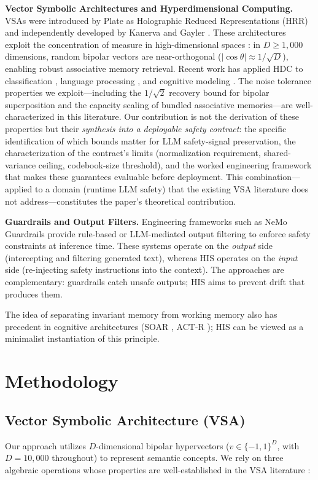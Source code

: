 \documentclass[a4paper,11pt]{article}
\begin{document}
\textbf{Vector Symbolic Architectures and Hyperdimensional Computing.}
VSAs were introduced by Plate \cite{plate1995} as Holographic Reduced Representations (HRR) and independently developed by Kanerva \cite{kanerva2009} and Gayler \cite{gayler2003}. These architectures exploit the concentration of measure in high-dimensional spaces \cite{vershynin2018}: in $D \geq 1{,}000$ dimensions, random bipolar vectors are near-orthogonal ($|\cos\theta| \approx 1/\sqrt{D}$), enabling robust associative memory retrieval. Recent work has applied HDC to classification \cite{thomas2021}, language processing \cite{schlegel2022}, and cognitive modeling \cite{eliasmith2012}. The noise tolerance properties we exploit---including the $1/\sqrt{2}$ recovery bound for bipolar superposition and the capacity scaling of bundled associative memories---are well-characterized in this literature. Our contribution is not the derivation of these properties but their \textit{synthesis into a deployable safety contract}: the specific identification of which bounds matter for LLM safety-signal preservation, the characterization of the contract's limits (normalization requirement, shared-variance ceiling, codebook-size threshold), and the worked engineering framework that makes these guarantees evaluable before deployment. This combination---applied to a domain (runtime LLM safety) that the existing VSA literature does not address---constitutes the paper's theoretical contribution.

\textbf{Guardrails and Output Filters.}
Engineering frameworks such as NeMo Guardrails \cite{rebedea2023} provide rule-based or LLM-mediated output filtering to enforce safety constraints at inference time. These systems operate on the \textit{output} side (intercepting and filtering generated text), whereas HIS operates on the \textit{input} side (re-injecting safety instructions into the context). The approaches are complementary: guardrails catch unsafe outputs; HIS aims to prevent drift that produces them.

The idea of separating invariant memory from working memory also has precedent in cognitive architectures (SOAR \cite{laird2012}, ACT-R \cite{anderson2004}); HIS can be viewed as a minimalist instantiation of this principle.

\section{Methodology}

\subsection{Vector Symbolic Architecture (VSA)}
Our approach utilizes $D$-dimensional bipolar hypervectors ($v \in \{-1,1\}^{D}$, with $D = 10{,}000$ throughout) to represent semantic concepts. We rely on three algebraic operations whose properties are well-established in the VSA literature \cite{kanerva2009, plate1995, gayler2003}:
\end{document}
